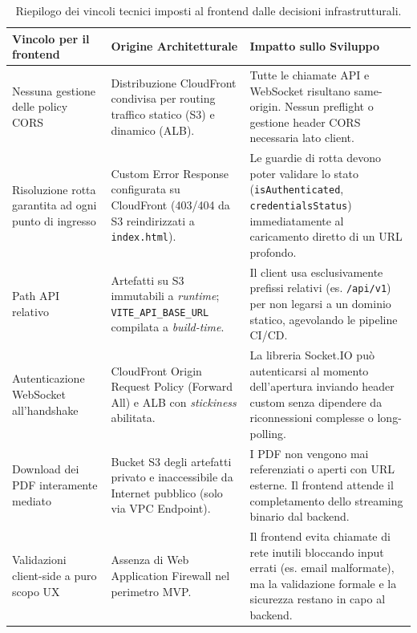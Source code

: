 \documentclass[11pt,a4paper]{article}
\begin{document}
\begin{table}[H]
\centering
\caption{Riepilogo dei vincoli tecnici imposti al frontend dalle decisioni infrastrutturali.}
\label{tab:fe-vincoli-riepilogo}
\vspace{2mm}
\renewcommand{\arraystretch}{1.2}
\begin{tabularx}{\textwidth}{|X|X|X|}
\hline
\textbf{Vincolo per il frontend} & \textbf{Origine Architetturale} & \textbf{Impatto sullo Sviluppo} \\ \hline
Nessuna gestione delle policy CORS & Distribuzione CloudFront condivisa per routing traffico statico (S3) e dinamico (ALB). & Tutte le chiamate API e WebSocket risultano same-origin. Nessun preflight o gestione header CORS necessaria lato client. \\ \hline
Risoluzione rotta garantita ad ogni punto di ingresso & Custom Error Response configurata su CloudFront (403/404 da S3 reindirizzati a \texttt{index.html}). & Le guardie di rotta devono poter validare lo stato (\texttt{isAuthenticated}, \texttt{credentialsStatus}) immediatamente al caricamento diretto di un URL profondo. \\ \hline
Path API relativo & Artefatti su S3 immutabili a \emph{runtime}; \texttt{VITE\_API\_BASE\_URL} compilata a \emph{build-time}. & Il client usa esclusivamente prefissi relativi (es. \texttt{/api/v1}) per non legarsi a un dominio statico, agevolando le pipeline CI/CD. \\ \hline
Autenticazione WebSocket all'handshake & CloudFront Origin Request Policy (Forward All) e ALB con \emph{stickiness} abilitata. & La libreria Socket.IO può autenticarsi al momento dell'apertura inviando header custom senza dipendere da riconnessioni complesse o long-polling. \\ \hline
Download dei PDF interamente mediato & Bucket S3 degli artefatti privato e inaccessibile da Internet pubblico (solo via VPC Endpoint). & I PDF non vengono mai referenziati o aperti con URL esterne. Il frontend attende il completamento dello streaming binario dal backend. \\ \hline
Validazioni client-side a puro scopo UX & Assenza di Web Application Firewall nel perimetro MVP. & Il frontend evita chiamate di rete inutili bloccando input errati (es. email malformate), ma la validazione formale e la sicurezza restano in capo al backend. \\ \hline
\end{tabularx}
\end{table}
\end{document}
